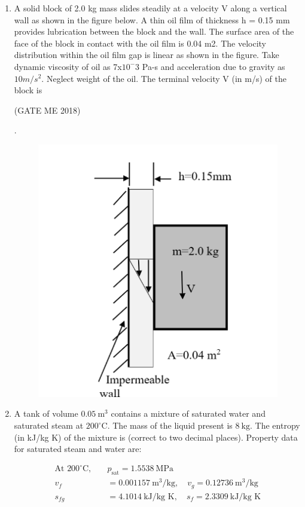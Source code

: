 \documentclass[journal]{IEEEtran}
\numberwithin{equation}{enumi}
\numberwithin{figure}{enumi}
\begin{document}
\begin{enumerate}
\item 
A solid block of 2.0 kg mass slides steadily at a velocity V along a vertical wall as shown in the figure below. A thin oil film of thickness h = 0.15 mm provides lubrication between the block and the wall. The surface area of the face of the block in contact with the oil film is 0.04 m2. The velocity distribution within the oil film gap is linear as shown in the figure. Take dynamic viscosity of oil as 7x$10^-3$ Pa-s and acceleration due to gravity as $10 m/s^2$. Neglect weight of the oil. The terminal velocity V (in m/s) of the block is

 
\hfill{(GATE ME 2018)}

 \centering
 .\begin{figure}[H]
    \includegraphics[width = 0.6\columnwidth]{figs/fig3.14.png}
    \caption*{}
    \label{fig:Q43}
    \end{figure} 
\item  A tank of volume $0.05~\text{m}^3$ contains a mixture of saturated water and saturated steam at $200^\circ\text{C}$.  The mass of the liquid present is $8~\text{kg}$. The entropy (in kJ/kg K) of the mixture is \underline{\hspace{3cm}} (correct to two decimal places).  
Property data for saturated steam and water are:
  
  \begin{align*}
  \text{At } 200^\circ\text{C}, \quad & p_{\text{sat}} = 1.5538~\text{MPa} \\
  v_f &= 0.001157~\text{m}^3/\text{kg}, \quad v_g = 0.12736~\text{m}^3/\text{kg} \\
  s_{fg} &= 4.1014~\text{kJ/kg K}, \quad s_f = 2.3309~\text{kJ/kg K}
  \end{align*}
  

\end{enumerate}
\end{document}
